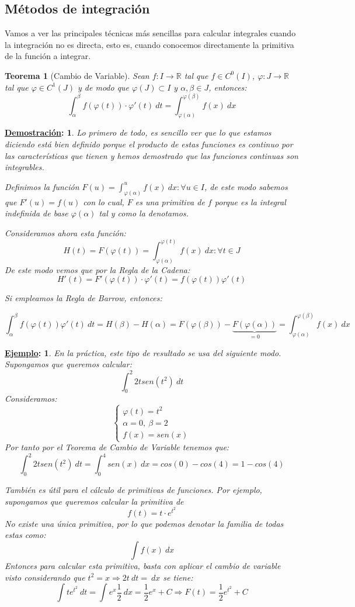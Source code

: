 \documentclass[10pt,a4paper,openright]{book}
\theoremstyle{break}
\newtheorem*{theo}{Teorema}
\newtheorem*{demo}{\underline{Demostración}:}
\newtheorem*{ej}{\underline{Ejemplo}:}
\newcommand{\dif}[1]{\ d#1}
\begin{document}
\subsection{Métodos de integración}
Vamos a ver las principales técnicas más sencillas para calcular integrales cuando la integración no es directa, esto es, cuando conocemos directamente la primitiva de la función a integrar.

\begin{theo}[Cambio de Variable]
Sean $f:I\rightarrow \mathbb R$ tal que $f\in C^0(I)$, $\varphi: J\rightarrow \mathbb R$ tal que $\varphi\in C^1(J)$ y de modo que $\varphi(J)\subset I$ y $\alpha,\beta\in J$, entonces:
$$\int_{\alpha}^{\beta} f(\varphi(t))\cdot \varphi'(t)\dif{t} = \int_{\varphi(\alpha)}^{\varphi(\beta)} f(x)\dif{x}$$
\end{theo}
\begin{demo}
Lo primero de todo, es sencillo ver que lo que estamos diciendo está bien definido porque el producto de estas funciones es continuo por las características que tienen y hemos demostrado que las funciones continuas son integrables.

Definimos la función $F(u)=\int_{\varphi(\alpha)}^{u} f(x)\dif{x}: \forall u \in I$, de este modo sabemos que $F'(u)=f(u)$ con lo cual, $F$ es una primitiva de $f$ porque es la integral indefinida de base $\varphi(\alpha)$ tal y como la denotamos.

Consideramos ahora esta función:
$$H(t)=F(\varphi(t))=\int_{\varphi(\alpha)}^{\varphi(t)} f(x)\dif{x}: \forall t\in J$$
De este modo vemos que por la Regla de la Cadena:
$$H'(t)=F'(\varphi(t))\cdot \varphi'(t)= f(\varphi(t))\varphi'(t)$$

Si empleamos la Regla de Barrow, entonces:

$$\int_{\alpha}^{\beta} f(\varphi(t)) \varphi ' (t) \dif{t} = H (\beta) - H(\alpha) = F(\varphi(\beta)) - \underbrace{F(\varphi(\alpha))}_{= 0} =  \int_{\varphi (\alpha)}^{\varphi (\beta)} f(x) \dif{x}$$
\end{demo}

\begin{ej}
En la práctica, este tipo de resultado se usa del siguiente modo. Supongamos que queremos calcular:
$$\int_{0}^{2} 2tsen(t^2)\dif{t}$$
Consideramos:
$$\begin{cases} \varphi(t)=t^2 \\ \alpha = 0, \ \beta = 2 \\
f(x)=sen(x)\end{cases}$$
Por tanto por el Teorema de Cambio de Variable tenemos que:
$$\int_{0}^{2} 2tsen(t^2)\dif{t} = \int_{0}^{4} sen(x)\dif{x} = cos(0)-cos(4)= 1-cos(4)$$

También es útil para el cálculo de primitivas de funciones. Por ejemplo, supongamos que queremos calcular la primitiva de
$$f(t)=t\cdot e^{t^2}$$
No existe una única primitiva, por lo que podemos denotar la familia de todas estas como:
$$\int f(x)\dif{x}$$
Entonces para calcular esta primitiva, basta con aplicar el cambio de variable visto considerando que $ t^2 = x \Rightarrow 2t\dif{t}=\dif{x}$ se tiene:
$$\int t e^{t^2} \dif{t}  = \int e^x \frac{1}{2} \dif{x} = \frac{1}{2} e^x + C \Rightarrow F(t)=\frac{1}{2}e^{t^2} + C$$
\end{ej}
\end{document}
